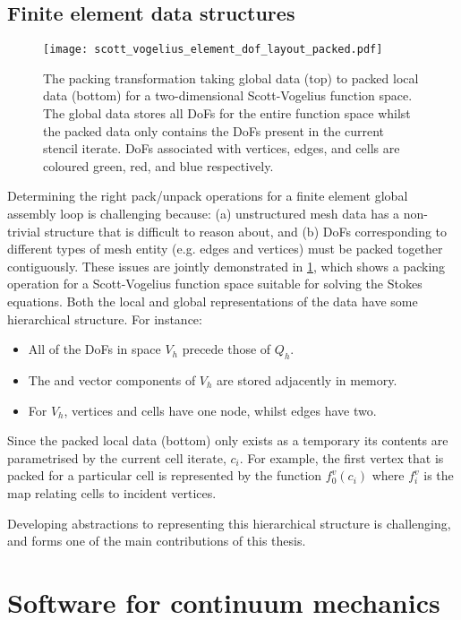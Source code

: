 \documentclass[thesis]{subfiles}
\begin{document}
\subsection{Finite element data structures}

\begin{figure}
  \centering
  \texttt{[image: scott\_vogelius\_element\_dof\_layout\_packed.pdf]}
  \caption{
    The packing transformation taking global data (top) to packed local data (bottom) for a two-dimensional Scott-Vogelius function space.
    The global data stores all DoFs for the entire function space whilst the packed data only contains the DoFs present in the current stencil iterate.
    DoFs associated with vertices, edges, and cells are coloured green, red, and blue respectively.
  }
  \label{fig:scott_vogelius_element_dof_layout_packed}
\end{figure}

Determining the right pack/unpack operations for a finite element global assembly loop is challenging because:
(a) unstructured mesh data has a non-trivial structure that is difficult to reason about, and
(b) DoFs corresponding to different types of mesh entity (e.g. edges and vertices) must be packed together contiguously.
These issues are jointly demonstrated in \cref{fig:scott_vogelius_element_dof_layout_packed}, which shows a packing operation for a Scott-Vogelius function space suitable for solving the Stokes equations.
Both the local and global representations of the data have some hierarchical structure.
For instance:
\begin{itemize}
  \item All of the DoFs in space $V_h$ precede those of $Q_h$.
  \item The  and  vector components of $V_h$ are stored adjacently in memory.
  \item For $V_h$, vertices and cells have one node, whilst edges have two.
\end{itemize}
Since the packed local data (bottom) only exists as a temporary its contents are parametrised by the current cell iterate, $c_i$.
For example, the first vertex that is packed for a particular cell is represented by the function $f^v_0(c_i)$ where $f^v_i$ is the map relating cells to incident vertices.

Developing abstractions to representing this hierarchical structure is challenging, and forms one of the main contributions of this thesis.

\section{Software for continuum mechanics}
\label{sec:introduction_software}
\end{document}
